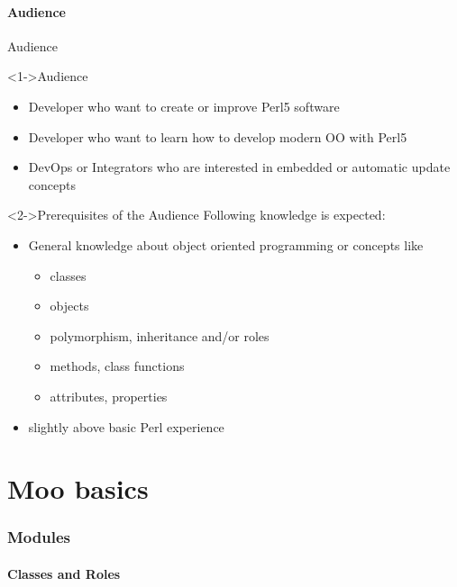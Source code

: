\documentclass[ngerman,xcolor={table,dvipsnames},smaller,compress,hyperref={bookmarks,colorlinks},handout]{beamer}%
\begin{document}
\subsection{Audience}

\begin{frame}[t,fragile]{Audience}
\begin{block}<1->{Audience}
\begin{itemize}
\item Developer who want to create or improve Perl5 software
\item Developer who want to learn how to develop modern OO with Perl5
\item DevOps or Integrators who are interested in embedded or automatic update concepts
\end{itemize}
\end{block}

\begin{block}<2->{Prerequisites of the Audience}
Following knowledge is expected:
\begin{itemize}
\item General knowledge about object oriented programming or concepts like
    \small
    \begin{itemize}
    \item classes
    \item objects
    \item polymorphism, inheritance and/or roles
    \item methods, class functions
    \item attributes, properties
    \end{itemize}
    \normalsize
\item slightly above basic Perl experience
\end{itemize}
\end{block}
\end{frame}

\part{Moo basics}

\section{Modules}

\subsection{Classes and Roles}
\end{document}
